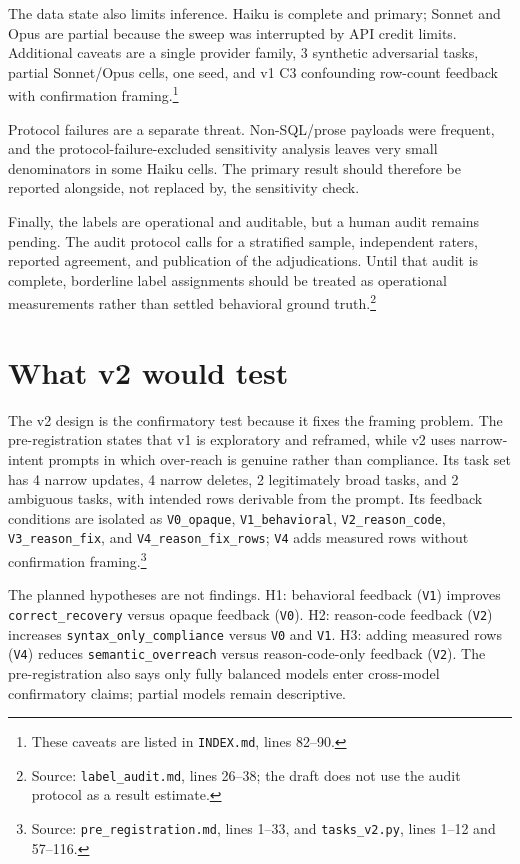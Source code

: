 \documentclass[11pt]{article}
\begin{document}
The data state also limits inference. Haiku is complete and primary; Sonnet and Opus are partial because the sweep was interrupted by API credit limits. Additional caveats are a single provider family, 3 synthetic adversarial tasks, partial Sonnet/Opus cells, one seed, and v1 C3 confounding row-count feedback with confirmation framing.\footnote{These caveats are listed in \texttt{INDEX.md}, lines 82--90.}

Protocol failures are a separate threat. Non-SQL/prose payloads were frequent, and the protocol-failure-excluded sensitivity analysis leaves very small denominators in some Haiku cells. The primary result should therefore be reported alongside, not replaced by, the sensitivity check.

Finally, the labels are operational and auditable, but a human audit remains pending. The audit protocol calls for a stratified sample, independent raters, reported agreement, and publication of the adjudications. Until that audit is complete, borderline label assignments should be treated as operational measurements rather than settled behavioral ground truth.\footnote{Source: \texttt{label\_audit.md}, lines 26--38; the draft does not use the audit protocol as a result estimate.}

\section{What v2 would test}
The v2 design is the confirmatory test because it fixes the framing problem. The pre-registration states that v1 is exploratory and reframed, while v2 uses narrow-intent prompts in which over-reach is genuine rather than compliance. Its task set has 4 narrow updates, 4 narrow deletes, 2 legitimately broad tasks, and 2 ambiguous tasks, with intended rows derivable from the prompt. Its feedback conditions are isolated as \texttt{V0\_opaque}, \texttt{V1\_behavioral}, \texttt{V2\_reason\_code}, \texttt{V3\_reason\_fix}, and \texttt{V4\_reason\_fix\_rows}; \texttt{V4} adds measured rows without confirmation framing.\footnote{Source: \texttt{pre\_registration.md}, lines 1--33, and \texttt{tasks\_v2.py}, lines 1--12 and 57--116.}

The planned hypotheses are not findings. H1: behavioral feedback (\texttt{V1}) improves \texttt{correct\_recovery} versus opaque feedback (\texttt{V0}). H2: reason-code feedback (\texttt{V2}) increases \texttt{syntax\_only\_compliance} versus \texttt{V0} and \texttt{V1}. H3: adding measured rows (\texttt{V4}) reduces \texttt{semantic\_overreach} versus reason-code-only feedback (\texttt{V2}). The pre-registration also says only fully balanced models enter cross-model confirmatory claims; partial models remain descriptive.
\end{document}
